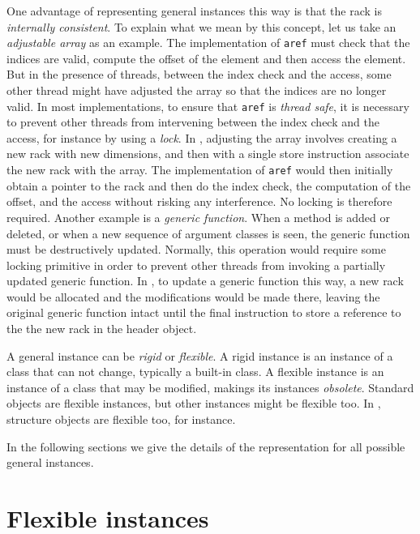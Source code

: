 One advantage of representing general instances this way is that the
rack is \emph{internally consistent}.  To explain what we
mean by this concept, let us take an \emph{adjustable array} as an
example.  The implementation of \texttt{aref} must check that the
indices are valid, compute the offset of the element and then access
the element.  But in the presence of threads, between the index check
and the access, some other thread might have adjusted the array so
that the indices are no longer valid.  In most implementations, to
ensure that \texttt{aref} is \emph{thread safe}, it is necessary to
prevent other threads from intervening between the index check and the
access, for instance by using a \emph{lock}.  In \sysname{}, adjusting
the array involves creating a new rack with new dimensions,
and then with a single store instruction associate the new rack
with the array.  The implementation of \texttt{aref} would then
initially obtain a pointer to the rack and then do the
index check, the computation of the offset, and the access without
risking any interference.  No locking is therefore required.  Another
example is a \emph{generic function}.  When a method is added or
deleted, or when a new sequence of argument classes is seen, the
generic function must be destructively updated.  Normally, this
operation would require some locking primitive in order to prevent
other threads from invoking a partially updated generic function.  In
\sysname{}, to update a generic function this way, a new rack
would be allocated and the modifications would be made there,
leaving the original generic function intact until the final
instruction to store a reference to the the new rack in the
header object.

A general instance can be \emph{rigid} or \emph{flexible}.  A rigid
instance is an instance of a class that can not change, typically a
built-in class.  A flexible instance is an instance of a class that
may be modified, makings its instances \emph{obsolete}.  Standard
objects are flexible instances, but other instances might be flexible
too.  In \sysname{}, structure objects are flexible too, for
instance.

In the following sections we give the details of the representation
for all possible general instances.

\section{Flexible instances}
\label{sec-data-representation-flexible-instances}

